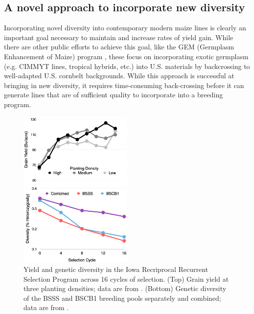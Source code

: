 \documentclass[draft,12pt]{article}
\begin{document}
\subsection*{A novel approach to incorporate new diversity}

Incorporating novel diversity into contemporary modern maize lines is clearly an important goal necessary to maintain and increase rates of yield gain.
While there are other public efforts to achieve this goal, like the GEM  (Germplasm Enhancement of Maize) program \citep{pollak2003history}, these  focus on incorporating exotic germplasm (e.g. CIMMYT lines, tropical hybrids, etc.) into U.S. materials by backcrossing to well-adapted U.S. cornbelt backgrounds.
While this approach is successful at bringing in new diversity, it requires time-consuming back-crossing before it can generate lines that are of sufficient quality to incorporate into a breeding program.


\begin{figure}
\includegraphics[width=0.5\textwidth]{BSSS.png}
\caption{Yield and genetic diversity in the Iowa Recriprocal Recurrent Selection Program across 16 cycles of selection. (Top) Grain yield at three planting densities; data are from \citet{rouse2003selection}. (Bottom) Genetic diversity of the BSSS and BSCB1 breeding pools separately and combined; data are from \citet{Gerke:2013tw}.} 
\label{fig:trends}
\end{figure}
\end{document}
